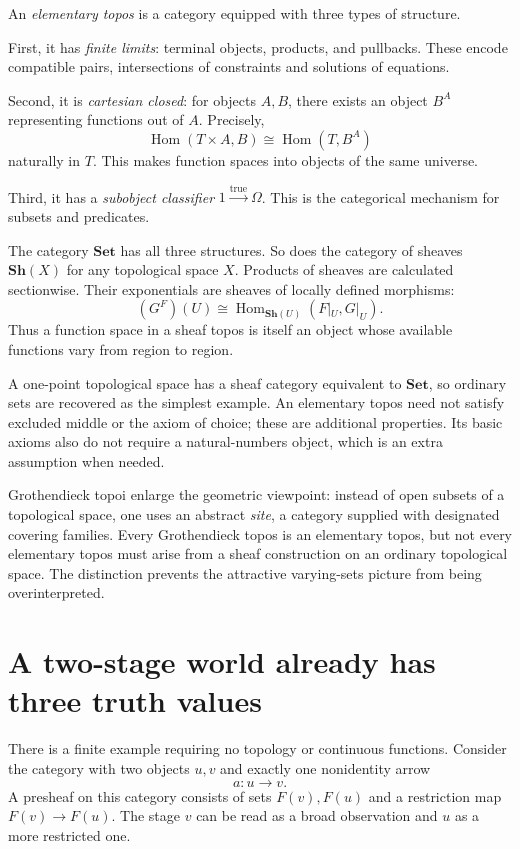 An \emph{elementary topos} is a category equipped with three types of structure.

First, it has \emph{finite limits}: terminal objects, products, and pullbacks. These encode compatible pairs, intersections of constraints and solutions of equations.

Second, it is \emph{cartesian closed}: for objects \(A,B\), there exists an object \(B^A\) representing functions out of \(A\). Precisely,
\[
 \boxed{\operatorname{Hom}(T\times A,B)
   \cong\operatorname{Hom}(T,B^A)}
\]
naturally in \(T\). This makes function spaces into objects of the same universe.

Third, it has a \emph{subobject classifier} \(1\xrightarrow{\operatorname{true}}\Omega\). This is the categorical mechanism for subsets and predicates.

The category \(\mathbf{Set}\) has all three structures. So does the category of sheaves \(\mathbf{Sh}(X)\) for any topological space \(X\). Products of sheaves are calculated sectionwise. Their exponentials are sheaves of locally defined morphisms:
\[
 (G^F)(U)\cong
 \operatorname{Hom}_{\mathbf{Sh}(U)}(F|_U,G|_U).
\]
Thus a function space in a sheaf topos is itself an object whose available functions vary from region to region.

A one-point topological space has a sheaf category equivalent to \(\mathbf{Set}\), so ordinary sets are recovered as the simplest example. An elementary topos need not satisfy excluded middle or the axiom of choice; these are additional properties. Its basic axioms also do not require a natural-numbers object, which is an extra assumption when needed.

Grothendieck topoi enlarge the geometric viewpoint: instead of open subsets of a topological space, one uses an abstract \emph{site}, a category supplied with designated covering families. Every Grothendieck topos is an elementary topos, but not every elementary topos must arise from a sheaf construction on an ordinary topological space. The distinction prevents the attractive varying-sets picture from being overinterpreted.

\section{A two-stage world already has three truth values}

There is a finite example requiring no topology or continuous functions. Consider the category with two objects \(u,v\) and exactly one nonidentity arrow
\[
 a:u\longrightarrow v.
\]
A presheaf on this category consists of sets \(F(v),F(u)\) and a restriction map \(F(v)\to F(u)\). The stage \(v\) can be read as a broad observation and \(u\) as a more restricted one.

